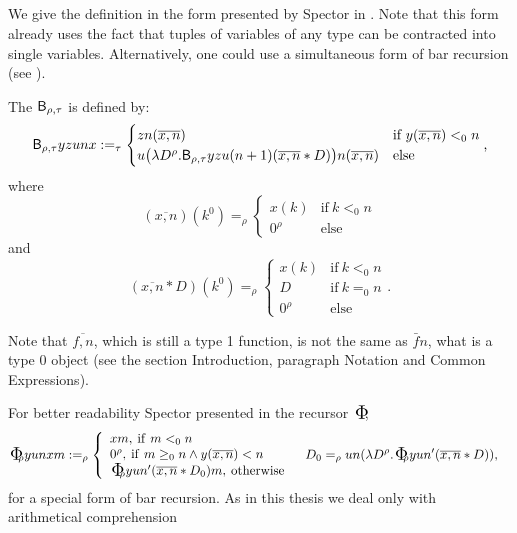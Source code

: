 \subsection{} \label{ss:BR}
We give the definition in the form presented by Spector in 
\cite{Spector62}. Note that this form already 
uses the fact that tuples of variables of any type can be 
contracted into single variables. Alternatively, one could use a 
simultaneous form of bar recursion (see \cite{Kohlenbach08}).
\begin{dfn}
\label{d:BR}
The  $\textsf{\upshape B}_{\rho,\tau}$ is defined by:
\[
\textsf{\upshape B}_{\rho,\tau}yzunx:=_\tau\begin{cases}
   zn(\overline{x,n})&\text{if}\ y(\overline{x,n})<_0n\\
   u\big(\lambda D^\rho.\textsf{\upshape B}_{\rho,\tau}yzu(n+1)(\overline{x,n}*D)\big)n(\overline{x,n})&\text{else}
   \end{cases}
\text{,}\]
where
\[
(\overline{x,n})(k^0)=_\rho\begin{cases}
  x(k)&\text{if}\ k<_0 n\\
  0^\rho&\text{else}
  \end{cases}
\]
and
\[
(\overline{x,n}*D)(k^0)=_\rho\begin{cases}
  x(k)&\text{if}\ k<_0 n\\
  D&\text{if}\ k=_0 n\\
  0^\rho&\text{else}
  \end{cases}
\text{.}\]
\end{dfn}
%
\begin{rmk}
  Note that $\overline{f,n}$, which is
  still a type 1 function, is not the same as $\bar fn$, what is a type 0 object
  (see the section Introduction, paragraph Notation and Common Expressions).
\end{rmk}
%
For better readability Spector presented in \cite{Spector62}
the recursor $\bPhi$,
\begin{align*}
& \bPhi_\rho yunxm:=_{\rho}\left\{ \begin{array}{l} 
        xm,\: \mathrm{if}\ m<_0n\\
        0^\rho,\: \mathrm{if}\ m\geq_0n \wedge y(\overline{x,n})<n\\
        \bPhi_\rho yun' (\overline{x,n}*D_0)m,\: \mathrm{otherwise}
\end{array} \right. &&  D_0=_\rho un(\lambda D^\rho.\bPhi_\rho yun'(\overline{x,n}*D))\text{,}&
\end{align*}
for a special form of bar recursion.
As in this thesis we deal only with arithmetical comprehension
